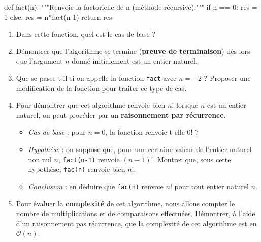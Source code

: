 \documentclass[
  letterpaper,
  DIV=11,
  numbers=noendperiod]{scrartcl}
\newenvironment{Shaded}{\begin{snugshade}}{\end{snugshade}}
\newcommand{\CommentTok}[1]{\textcolor[rgb]{0.37,0.37,0.37}{#1}}
\newcommand{\ControlFlowTok}[1]{\textcolor[rgb]{0.00,0.23,0.31}{#1}}
\newcommand{\DecValTok}[1]{\textcolor[rgb]{0.68,0.00,0.00}{#1}}
\newcommand{\KeywordTok}[1]{\textcolor[rgb]{0.00,0.23,0.31}{#1}}
\newcommand{\NormalTok}[1]{\textcolor[rgb]{0.00,0.23,0.31}{#1}}
\newcommand{\OperatorTok}[1]{\textcolor[rgb]{0.37,0.37,0.37}{#1}}
\providecommand{\tightlist}{%
  \setlength{\itemsep}{0pt}\setlength{\parskip}{0pt}}\usepackage{longtable,booktabs,array}
\begin{document}
\begin{Shaded}
\begin{Highlighting}[]
  \KeywordTok{def}\NormalTok{ fact(n):}
    \CommentTok{"""Renvoie la factorielle de n (méthode récursive)."""}
    \ControlFlowTok{if}\NormalTok{ n }\OperatorTok{==} \DecValTok{0}\NormalTok{:}
\NormalTok{      res }\OperatorTok{=} \DecValTok{1}
    \ControlFlowTok{else}\NormalTok{:}
\NormalTok{      res }\OperatorTok{=}\NormalTok{ n}\OperatorTok{*}\NormalTok{fact(n}\OperatorTok{{-}}\DecValTok{1}\NormalTok{)}
    \ControlFlowTok{return}\NormalTok{ res}
\end{Highlighting}
\end{Shaded}

\begin{enumerate}
\def\labelenumi{\arabic{enumi}.}
\item
  Dans cette fonction, quel est le cas de base ?
\item
  Démontrer que l'algorithme se termine (\textbf{preuve de terminaison})
  dès lors que l'argument \(n\) donné initialement est un entier
  naturel.
\item
  Que se passe-t-il si on appelle la fonction \texttt{fact} avec
  \(n=-2\) ? Proposer une modification de la fonction pour traiter ce
  type de cas.
\item
  Pour démontrer que cet algorithme renvoie bien \(n!\) lorsque \(n\)
  est un entier naturel, on peut procéder par un \textbf{raisonnement
  par récurrence}.

  \begin{itemize}
  \tightlist
  \item
    \emph{Cas de base} : pour \(n=0\), la fonction renvoie-t-elle \(0!\)
    ?
  \item
    \emph{Hypothèse} : on suppose que, pour une certaine valeur de
    l'entier naturel non nul \(n\), \texttt{fact(n-1)} renvoie
    \((n-1)!\). Montrer que, sous cette hypothèse, \texttt{fac(n)}
    renvoie bien \(n!\).
  \item
    \emph{Conclusion} : en déduire que \texttt{fac(n)} renvoie \(n!\)
    pour tout entier naturel \(n\).
  \end{itemize}
\item
  Pour évaluer la \textbf{complexité} de cet algorithme, nous allons
  compter le nombre de multiplications et de comparaisons effectuées.
  Démontrer, à l'aide d'un raisonnement pas récurrence, que la
  complexité de cet algorithme est en \(\mathcal{O}(n)\).
\end{enumerate}
\end{document}
